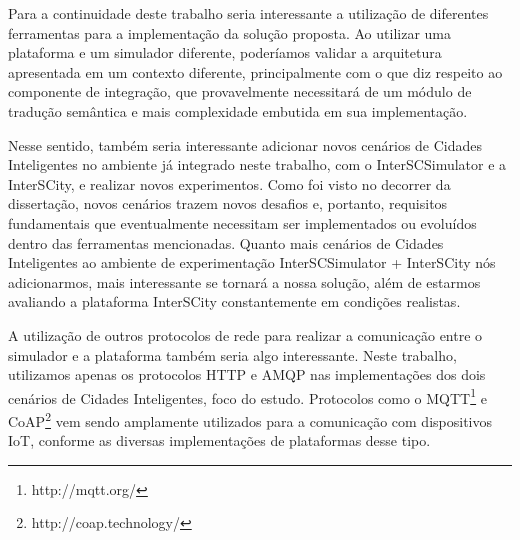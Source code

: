 Para a continuidade deste trabalho seria interessante a utilização de diferentes ferramentas para a implementação da solução proposta.
Ao utilizar uma plataforma e um simulador diferente, poderíamos validar a arquitetura apresentada em um contexto diferente, principalmente com o que diz respeito ao componente de integração, que provavelmente
necessitará de um módulo de tradução semântica e mais complexidade embutida em sua implementação.

Nesse sentido, também seria interessante adicionar novos cenários de Cidades Inteligentes no ambiente já integrado neste trabalho, com o InterSCSimulator e a InterSCity, e realizar novos experimentos.
Como foi visto no decorrer da dissertação, novos cenários trazem novos desafios e, portanto, requisitos fundamentais que eventualmente necessitam ser implementados ou evoluídos dentro das ferramentas 
mencionadas.
Quanto mais cenários de Cidades Inteligentes ao ambiente de experimentação InterSCSimulator + InterSCity nós adicionarmos, mais interessante se tornará a nossa solução, além de estarmos avaliando a
plataforma InterSCity constantemente em condições realistas.

A utilização de outros protocolos de rede para realizar a comunicação entre o simulador e a plataforma também seria algo interessante.
Neste trabalho, utilizamos apenas os protocolos HTTP e AMQP nas implementações dos dois cenários de Cidades Inteligentes, foco do estudo.
Protocolos como o MQTT\footnote{http://mqtt.org/} e CoAP\footnote{http://coap.technology/} vem sendo amplamente utilizados para a comunicação com dispositivos IoT, conforme as diversas implementações de
plataformas desse tipo.
